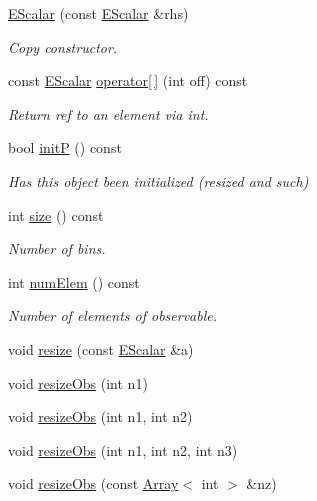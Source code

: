 \begin{DoxyCompactItemize}
\mbox{\hyperlink{classENSEM_1_1EScalar_a002ac4bc9bc6e5ad476613e4edaa827a}{E\+Scalar}} (const \mbox{\hyperlink{classENSEM_1_1EScalar}{E\+Scalar}} \&rhs)
\begin{DoxyCompactList}\small\item\em Copy constructor. \end{DoxyCompactList}\item 
const \mbox{\hyperlink{classENSEM_1_1EScalar}{E\+Scalar}} \mbox{\hyperlink{classENSEM_1_1EScalar_a20c80375941641aca36355253b3479ac}{operator\mbox{[}$\,$\mbox{]}}} (int off) const
\begin{DoxyCompactList}\small\item\em Return ref to an element via int. \end{DoxyCompactList}\item 
bool \mbox{\hyperlink{classENSEM_1_1EScalar_ac5b2f0fbee6aa61f80bcd2d0b4d5188c}{initP}} () const
\begin{DoxyCompactList}\small\item\em Has this object been initialized (resized and such) \end{DoxyCompactList}\item 
int \mbox{\hyperlink{classENSEM_1_1EScalar_a314f162d71b15a8eb7e3382a274aa12b}{size}} () const
\begin{DoxyCompactList}\small\item\em Number of bins. \end{DoxyCompactList}\item 
int \mbox{\hyperlink{classENSEM_1_1EScalar_a63584568dc8b1817a57656cc072205b2}{num\+Elem}} () const
\begin{DoxyCompactList}\small\item\em Number of elements of observable. \end{DoxyCompactList}\item 
void \mbox{\hyperlink{classENSEM_1_1EScalar_aff8eff3acd3686a6ae0b1a1a0dfd6426}{resize}} (const \mbox{\hyperlink{classENSEM_1_1EScalar}{E\+Scalar}} \&a)
\item 
void \mbox{\hyperlink{classENSEM_1_1EScalar_af9faf602be10ce072be3fc532a7e17fe}{resize\+Obs}} (int n1)
\item 
void \mbox{\hyperlink{classENSEM_1_1EScalar_ad4fe54c2fb8a3420e1e452228d8d40b1}{resize\+Obs}} (int n1, int n2)
\item 
void \mbox{\hyperlink{classENSEM_1_1EScalar_a1849b1cf66ab1a983ca9e1f268afd109}{resize\+Obs}} (int n1, int n2, int n3)
\item 
void \mbox{\hyperlink{classENSEM_1_1EScalar_a9273a529024099effecf6962eafa044e}{resize\+Obs}} (const \mbox{\hyperlink{classXMLArray_1_1Array}{Array}}$<$ int $>$ \&nz)

\end{DoxyCompactItemize}
